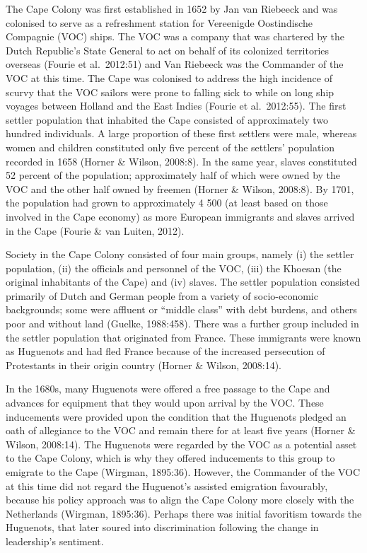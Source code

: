 \documentclass[11pt,preprint, authoryear]{elsarticle}
\numberwithin{equation}{section}
\numberwithin{figure}{section}
\numberwithin{table}{section}
\begin{document}
The Cape Colony was first established in 1652 by Jan van Riebeeck and
was colonised to serve as a refreshment station for Vereenigde
Oostindische Compagnie (VOC) ships. The VOC was a company that was
chartered by the Dutch Republic's State General to act on behalf of its
colonized territories overseas (Fourie et al.~2012:51) and Van Riebeeck
was the Commander of the VOC at this time. The Cape was colonised to
address the high incidence of scurvy that the VOC sailors were prone to
falling sick to while on long ship voyages between Holland and the East
Indies (Fourie et al.~2012:55). The first settler population that
inhabited the Cape consisted of approximately two hundred individuals. A
large proportion of these first settlers were male, whereas women and
children constituted only five percent of the settlers' population
recorded in 1658 (Horner \& Wilson, 2008:8). In the same year, slaves
constituted 52 percent of the population; approximately half of which
were owned by the VOC and the other half owned by freemen (Horner \&
Wilson, 2008:8). By 1701, the population had grown to approximately 4
500 (at least based on those involved in the Cape economy) as more
European immigrants and slaves arrived in the Cape (Fourie \& van
Luiten, 2012).

Society in the Cape Colony consisted of four main groups, namely (i) the
settler population, (ii) the officials and personnel of the VOC, (iii)
the Khoesan (the original inhabitants of the Cape) and (iv) slaves. The
settler population consisted primarily of Dutch and German people from a
variety of socio-economic backgrounds; some were affluent or ``middle
class'' with debt burdens, and others poor and without land (Guelke,
1988:458). There was a further group included in the settler population
that originated from France. These immigrants were known as Huguenots
and had fled France because of the increased persecution of Protestants
in their origin country (Horner \& Wilson, 2008:14).

In the 1680s, many Huguenots were offered a free passage to the Cape and
advances for equipment that they would upon arrival by the VOC. These
inducements were provided upon the condition that the Huguenots pledged
an oath of allegiance to the VOC and remain there for at least five
years (Horner \& Wilson, 2008:14). The Huguenots were regarded by the
VOC as a potential asset to the Cape Colony, which is why they offered
inducements to this group to emigrate to the Cape (Wirgman, 1895:36).
However, the Commander of the VOC at this time did not regard the
Huguenot's assisted emigration favourably, because his policy approach
was to align the Cape Colony more closely with the Netherlands (Wirgman,
1895:36). Perhaps there was initial favoritism towards the Huguenots,
that later soured into discrimination following the change in
leadership's sentiment.
\end{document}
